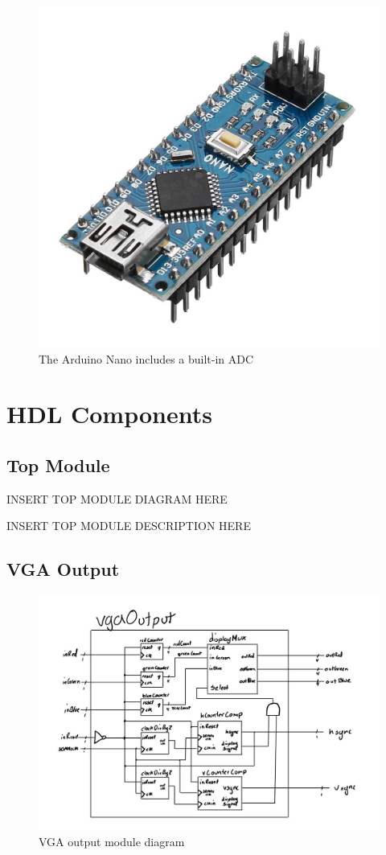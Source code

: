 \documentclass[a4paper]{article}
\begin{document}
\begin{figure}[H]
    \includegraphics[width=0.6 \linewidth]{images/nano.jpg}
    \caption{The Arduino Nano includes a built-in ADC}
    \label{nano}
\end{figure}



\section{HDL Components}

\subsection{Top Module}

INSERT TOP MODULE DIAGRAM HERE

INSERT TOP MODULE DESCRIPTION HERE

\subsection{VGA Output}

\begin{figure}[H]
    \includegraphics[width=0.8 \linewidth]{images/vgaOutput.JPG}
    \caption{VGA output module diagram}
    \label{vgaOutputDiagram}
\end{figure}
\end{document}
